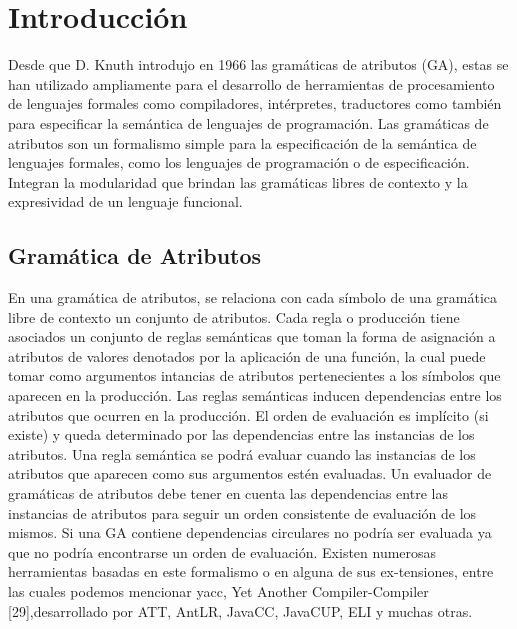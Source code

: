 \chapter{Introducci\'on}
\label{chap:intro}
\minitoc


Desde que D. Knuth introdujo en 1966 las gramáticas de atributos (GA), estas se han utilizado ampliamente para el desarrollo de herramientas de procesamiento de lenguajes formales como compiladores, intérpretes, traductores como también para especificar la semántica de lenguajes de programación. Las gramáticas de atributos son un formalismo simple para la especificación de la semántica de lenguajes formales, como los lenguajes de programación o de especificación. Integran la modularidad que brindan las gramáticas libres de contexto y la expresividad de un lenguaje funcional.

\section{Gramática de Atributos}

En una gramática de atributos, se relaciona con cada símbolo de una gramática libre de contexto un conjunto de atributos. Cada regla o producción tiene asociados un conjunto de reglas semánticas que toman la forma de asignación a atributos de valores denotados por la aplicación de una función, la cual puede tomar como argumentos intancias de atributos pertenecientes a los símbolos que aparecen en la producción.
Las reglas semánticas inducen dependencias entre los atributos que ocurren en la producción. El orden de evaluación es implícito (si existe) y queda determinado por las dependencias entre las instancias de los atributos.
Una regla semántica se podrá evaluar cuando las instancias de los atributos que aparecen como sus argumentos estén evaluadas. Un evaluador de gramáticas de atributos debe tener en cuenta las dependencias entre las instancias de atributos para seguir un orden consistente de evaluación de los mismos.
Si una GA contiene dependencias circulares no podría ser evaluada ya que no podría encontrarse un orden de evaluación. Existen numerosas herramientas basadas en este formalismo o en alguna de sus ex-tensiones, entre las cuales podemos mencionar yacc, Yet Another Compiler-Compiler [29],desarrollado por ATT, AntLR, JavaCC, JavaCUP, ELI y muchas otras.



